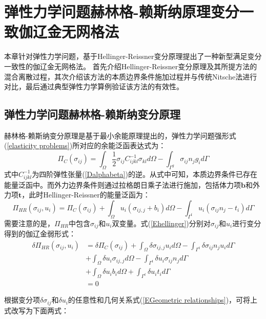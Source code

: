 \chapter{弹性力学问题赫林格-赖斯纳原理变分一致伽辽金无网格法}
本章针对弹性力学问题，基于Hellinger-Reissner变分原理提出了一种新型满足变分一致性的伽辽金无网格法。
首先介绍Hellinger-Reissner变分原理及其所提方法的混合离散过程，其次介绍该方法的本质边界条件施加过程并与传统Nitsche法进行对比，最后通过典型弹性力学算例验证该方法的有效性。
\section{弹性力学问题赫林格-赖斯纳变分原理}
赫林格-赖斯纳变分原理\cite{钱伟长1985广义变分原理}是基于最小余能原理提出的，弹性力学问题强形式(\ref{elasticity problems})所对应的余能泛函表达式为：
\begin{equation}
\Pi_C(\sigma_{ij}) = \int_\Omega \frac{1}{2}\sigma_{ij}C_{ijkl}^{-1}\sigma_{kl} d\Omega - \int_{\Gamma^g} \sigma_{ij} n_j g_i d\Gamma
\end{equation}
式中$C_{ijkl}^{-1}$为四阶弹性张量(\ref{Dalphabeta})的逆。从式中可知，本质边界条件已存在能量泛函中。而外力边界条件则通过拉格朗日乘子法进行施加，包括体力项$\pmb b$和外力项$\pmb t$，此时Hellinger-Reissner的能量泛函为：
\begin{equation}
\label{Ehellinger}
    \Pi_{H\!R}(\sigma_{ij},u_i)=\Pi_C(\sigma_{ij})
    +\int_{\Omega}u_i(\sigma_{ij,j}+b_i)d\Omega-\int_{\Gamma^t}u_i(\sigma_{ij} n_j-t_i)d\Gamma
\end{equation}
需要注意的是，$\Pi_{HR}$中包含$\sigma_{ij}$和$u_i$双变量。式(\ref{Ehellinger})分别对$\sigma_{ij}$和$u_i$进行变分得到的伽辽金弱形式：
\begin{equation}\label{weak form1}
\begin{split} 
    \delta\Pi_{H\!R}(\sigma_{ij},u_i)&=\delta\Pi_C(\sigma_{ij})+\int_{\Omega}\delta\sigma_{ij,j}u_id\Omega-\int_{\Gamma^t}\delta\sigma_{ij}n_ju_id\Gamma\\
    &+\int_{\Omega}\delta u_i\sigma_{ij,j}d\Omega-\int_{\Gamma^t}\delta u_i\sigma_{ij}n_jd\Gamma\\
    &+\int_{\Omega}\delta u_ib_id\Omega+\int_{\Gamma^t}\delta u_it_id\Gamma\\
    &=0
\end{split}
\end{equation}\par
根据变分项$\delta \sigma_{ij}$和$\delta u_i$的任意性和几何关系式(\ref{EGeometric relationships})，可将上式改写为下面两式：
